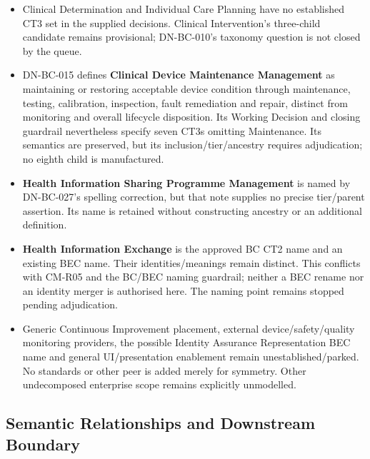 \begin{itemize}

\item
Clinical Determination and Individual Care Planning have no established CT3 set in the supplied decisions. Clinical Intervention’s three-child candidate remains provisional; DN-BC-010’s taxonomy question is not closed by the queue.



\item
DN-BC-015 defines \textbf{Clinical Device Maintenance Management} as maintaining or restoring acceptable device condition through maintenance, testing, calibration, inspection, fault remediation and repair, distinct from monitoring and overall lifecycle disposition. Its Working Decision and closing guardrail nevertheless specify seven CT3s omitting Maintenance. Its semantics are preserved, but its inclusion/\allowbreak{}tier/\allowbreak{}ancestry requires adjudication; no eighth child is manufactured.



\item
\textbf{Health Information Sharing Programme Management} is named by DN-BC-027’s spelling correction, but that note supplies no precise tier/\allowbreak{}parent assertion. Its name is retained without constructing ancestry or an additional definition.



\item
\textbf{Health Information Exchange} is the approved BC CT2 name and an existing BEC name. Their identities/\allowbreak{}meanings remain distinct. This conflicts with CM-R05 and the BC/\allowbreak{}BEC naming guardrail; neither a BEC rename nor an identity merger is authorised here. The naming point remains stopped pending adjudication.



\item
Generic Continuous Improvement placement, external device/\allowbreak{}safety/\allowbreak{}quality monitoring providers, the possible Identity Assurance Representation BEC name and general UI/\allowbreak{}presentation enablement remain unestablished/\allowbreak{}parked. No standards or other peer is added merely for symmetry. Other undecomposed enterprise scope remains explicitly unmodelled.



\end{itemize}
\label{rad:business:1235}
\subsection*{Semantic Relationships and Downstream Boundary}
\label{rad:business:1237}



